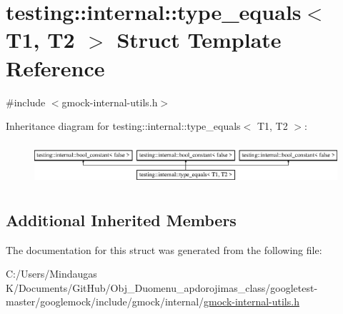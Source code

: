 \hypertarget{structtesting_1_1internal_1_1type__equals}{}\section{testing\+::internal\+::type\+\_\+equals$<$ T1, T2 $>$ Struct Template Reference}
\label{structtesting_1_1internal_1_1type__equals}


{\ttfamily \#include $<$gmock-\/internal-\/utils.\+h$>$}

Inheritance diagram for testing\+::internal\+::type\+\_\+equals$<$ T1, T2 $>$\+:\begin{figure}[H]
\begin{center}
\leavevmode
\includegraphics[height=1.562064cm]{df/d82/structtesting_1_1internal_1_1type__equals}
\end{center}
\end{figure}
\subsection*{Additional Inherited Members}


The documentation for this struct was generated from the following file\+:\begin{DoxyCompactItemize}
\item 
C\+:/\+Users/\+Mindaugas K/\+Documents/\+Git\+Hub/\+Obj\+\_\+\+Duomenu\+\_\+apdorojimas\+\_\+class/googletest-\/master/googlemock/include/gmock/internal/\mbox{\hyperlink{googletest-master_2googlemock_2include_2gmock_2internal_2gmock-internal-utils_8h}{gmock-\/internal-\/utils.\+h}}\end{DoxyCompactItemize}
